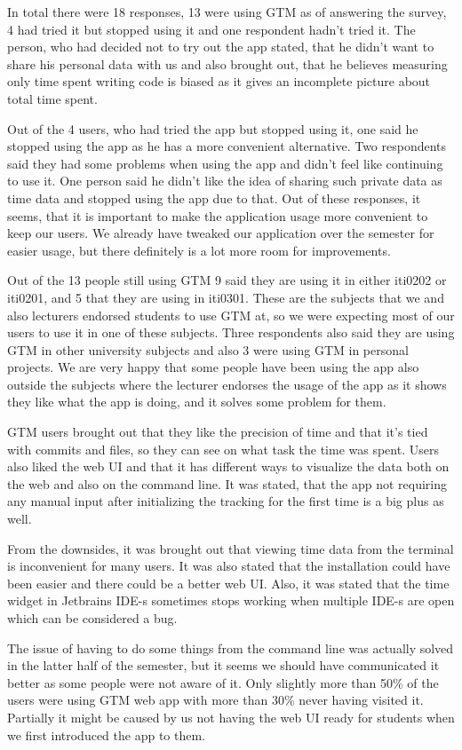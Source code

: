 In total there were 18 responses, 13 were using GTM as of answering the survey, 4 had tried it but stopped using it and one respondent hadn't tried it.
The person, who had decided not to try out the app stated, that he didn't want to share his personal data with us and also brought out,
that he believes measuring only time spent writing code is biased as it gives an incomplete picture about total time spent.

Out of the 4 users, who had tried the app but stopped using it, one said he stopped using the app as he has a more convenient alternative.
Two respondents said they had some problems when using the app and didn't feel like continuing to use it.
One person said he didn't like the idea of sharing such private data as time data and stopped using the app due to that.
Out of these responses, it seems, that it is important to make the application usage more convenient to keep our users.
We already have tweaked our application over the semester for easier usage, but there definitely is a lot more room for improvements.

Out of the 13 people still using GTM 9 said they are using it in either iti0202 or iti0201, and 5 that they are using in iti0301.
These are the subjects that we and also lecturers endorsed students to use GTM at, so we were expecting most of our
users to use it in one of these subjects.
Three respondents also said they are using GTM in other university subjects and also 3 were using GTM in personal projects.
We are very happy that some people have been using the app also outside the subjects where the lecturer endorses the usage of the app
as it shows they like what the app is doing, and it solves some problem for them.

GTM users brought out that they like the precision of time and that it's tied with commits and files, so they can see
on what task the time was spent.
Users also liked the web UI and that it has different ways to visualize the data both on the web and also on the command line.
It was stated, that the app not requiring any manual input after initializing the tracking for the first time is a big plus as well.

From the downsides, it was brought out that viewing time data from the terminal is inconvenient for many users.
It was also stated that the installation could have been easier and there could be a better web UI.
Also, it was stated that the time widget in Jetbrains IDE-s sometimes stops working when multiple IDE-s are open
which can be considered a bug.

The issue of having to do some things from the command line was actually solved in the latter half of the semester, but it seems
we should have communicated it better as some people were not aware of it.
Only slightly more than 50\% of the users were using GTM web app with more than 30\% never having visited it.
Partially it might be caused by us not having the web UI ready for students when we first introduced the app to them.

